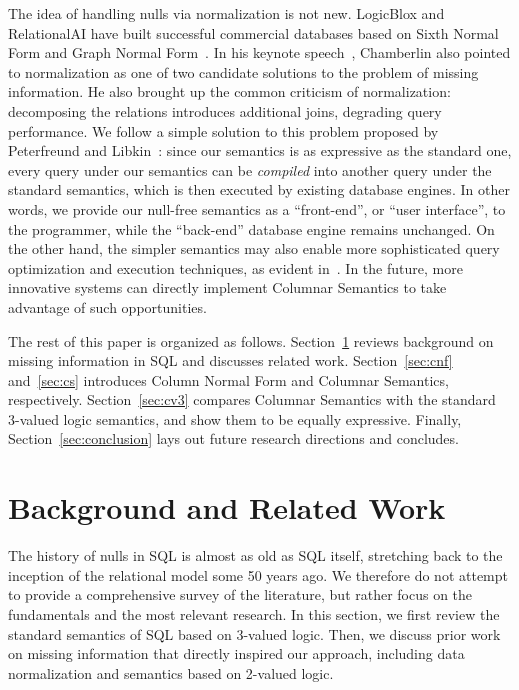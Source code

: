 \documentclass[sigconf]{acmart}
\begin{document}
The idea of handling nulls via normalization is not new.
LogicBlox and RelationalAI have built
 successful commercial databases based on Sixth Normal Form
 and Graph Normal Form~\cite{
  DBLP:books/daglib/0014409,
  RAIDocumentation,
  DBLP:conf/sigmod/ArefCGKOPVW15}.
In his keynote speech~\cite{DBLP:conf/sigmod/Chamberlin23},
 Chamberlin also pointed to normalization as 
 one of two candidate solutions 
 to the problem of missing information.
He also brought up the common criticism of normalization:
 decomposing the relations introduces additional joins,
 degrading query performance.
We follow a simple solution to this problem
 proposed by Peterfreund and Libkin~\cite{DBLP:conf/pods/LibkinP23}: 
 since our semantics is as expressive as the standard one,
 every query under our semantics can be {\em compiled} 
 into another query under the standard semantics,
 which is then executed by existing database engines.
In other words, we provide our null-free semantics as a
 ``front-end'', or ``user interface'', to the  programmer,
 while the ``back-end'' database engine remains unchanged.
On the other hand, the simpler semantics may also enable
 more sophisticated query optimization and execution techniques, 
 as evident in~\cite{DBLP:conf/pods/LibkinP23,DBLP:conf/sigmod/ArefCGKOPVW15,RAIDocumentation}.
In the future, more innovative systems can 
 directly implement Columnar Semantics 
 to take advantage of such opportunities.

The rest of this paper is organized as follows.
Section~\ref{sec:background} reviews background 
 on missing information in SQL and discusses related work.
Section~\ref{sec:cnf} and~\ref{sec:cs} introduces Column Normal Form 
 and Columnar Semantics, respectively.
Section~\ref{sec:cv3} compares Columnar Semantics with the standard 3-valued logic semantics, 
 and show them to be equally expressive.
Finally, Section~\ref{sec:conclusion}
 lays out future research directions and concludes.

\section{Background and Related Work}
\label{sec:background}

The history of nulls in SQL is almost as old as SQL itself,
 stretching back to the inception of the relational model some 50 years ago.
We therefore do not attempt to provide a comprehensive survey of the literature, 
 but rather focus on the fundamentals and the most relevant research.
In this section, we first review the standard semantics of SQL
 based on 3-valued logic.
Then, we discuss prior work on missing information that directly 
 inspired our approach,
 including data normalization and semantics based on 2-valued logic.
\end{document}
